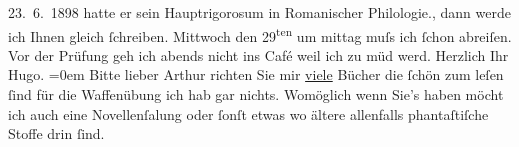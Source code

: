 \begin{ledgroupsized}[t]{13cm}
{{{                     23. 6. 1898 hatte er sein Hauptrigorosum in Romanischer
                  Philologie.}}}\label{K_L00808-2h}, dann werde {\pb}ich Ihnen gleich ſchreiben. Mittwoch den 29\textsuperscript{ten} um mittag muſs ich ſchon abreiſen.\pend
           \pstart
           Vor der Prüfung geh ich abends nicht ins Café weil ich zu müd werd.\pend
           \pstart
           Herzlich Ihr{\\[\baselineskip]}\spacefill\mbox{Hugo.}\pend
           \leftskip=0em{}\pstart
           \noindent{}Bitte lieber Arthur richten Sie {\pb}mir \uline{viele} Bücher die ſchön zum leſen ſind für
                  die Waffenübung ich hab gar nichts. Womöglich wenn Sie’s haben möcht ich auch eine
                     Novellenſa{\geminationm}lung oder ſonſt etwas wo ältere
                  allenfalls phantaſtiſche Stoffe drin ſind.\pend
           
         
         \endnumbering{}\end{ledgroupsized}  \newcommand{\dateiname}{L00808}\newcommand{\titel}{Hugo von Hofmannsthal an Arthur Schnitzler, [21. 6. 1898]}\newcommand{\editorInnen}{Martin Anton Müller und Gerd-Hermann Susen}
      
